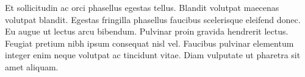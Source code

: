 \documentclass{article}
\begin{document}
Et sollicitudin ac orci phasellus egestas tellus. Blandit volutpat maecenas volutpat blandit. Egestas fringilla phasellus faucibus scelerisque eleifend donec. Eu augue ut lectus arcu bibendum. Pulvinar proin gravida hendrerit lectus. Feugiat pretium nibh ipsum consequat nisl vel. Faucibus pulvinar elementum integer enim neque volutpat ac tincidunt vitae. Diam vulputate ut pharetra sit amet aliquam. \cite{a_web_site}


 

\pagebreak

\end{document}
